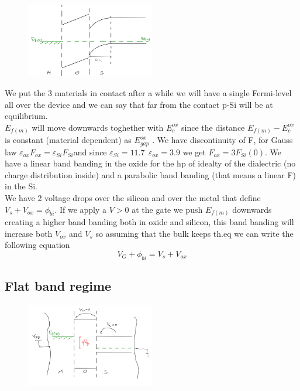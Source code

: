 \begin{figure}
\includegraphics[width=0.5\textwidth]{mos_theq.png}
\end{figure}

We put the 3 materials in contact after a while we will have a single Fermi-level all over the device and we can say that far from the contact p-Si will be at equilibrium.\\
$E_{f(m)}$ will move downwards toghether with $E_c^{ox}$ since the distance $E_{f(m)}-E_c^{ox}$ is constant (material dependent) as $E_{gap}^{ox}$ .
We have discontinuity of F, for Gauss law $\varepsilon_{ox}F_{ox}=\varepsilon_{Si}F_{Si}$and since $\varepsilon_{Si}=11.7\ \ \varepsilon_{ox}=3.9$ we get $F_{ox}=3F_{Si}(0)$. We have a linear band banding in the oxide for the hp of idealty of the dialectric (no charge distribution inside) and a parabolic band banding (that means a linear F) in the Si.\\
We have 2 voltage drops over the silicon and over the metal that define $V_s+V_{ox}=\phi_{bi}$.
If we apply a $V>0$ at the gate we push $E_{f(m)}$ downwards creating a higher band banding both in oxide and silicon, this band banding will increase both $V_{ox}$ and $V_{s}$ so assuming that the bulk keeps th.eq we can write the following equation
\begin{equation}
V_{G}+\phi_{bi}=V_s+V_{ox}
\end{equation}
\subsection{Flat band regime}
\begin{figure}
\includegraphics[width=0.5\textwidth]{mos_vfb.png}
\end{figure}

